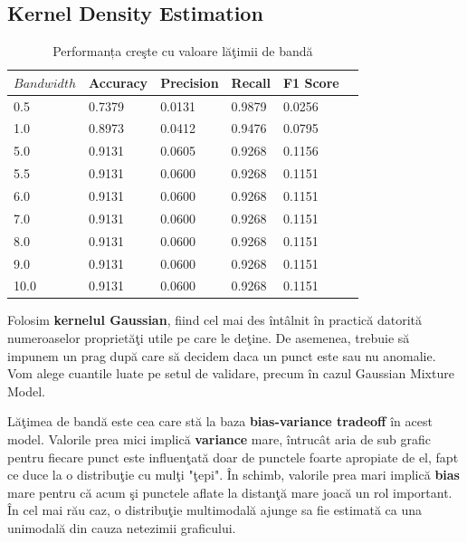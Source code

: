 \noindent
  

\subsection{Kernel Density Estimation}

\begin{table}[H]
  \centering
  \begin{tabularx}{\textwidth}{
      |X
      |X
      |X
      |X
      |X
      |X|
  }
  \hline
  $Bandwidth$ & {Accuracy} & {Precision} & {Recall} & {F1 Score} \\
  \hline
  \rowcolor{gray!20} 0.5 & 0.7379 & 0.0131 & 0.9879 & 0.0256 \\
  1.0 & 0.8973 & 0.0412 & 0.9476 & 0.0795 \\
  \rowcolor{gray!20} 5.0 & 0.9131 & 0.0605 & 0.9268 & 0.1156 \\
  5.5 & 0.9131 & 0.0600 & 0.9268 & 0.1151 \\
  \rowcolor{gray!20} 6.0 & 0.9131 & 0.0600 & 0.9268 & 0.1151 \\
  7.0 & 0.9131 & 0.0600 & 0.9268 & 0.1151 \\
  \rowcolor{gray!20} 8.0 & 0.9131 & 0.0600 & 0.9268 & 0.1151 \\
  9.0 & 0.9131 & 0.0600 & 0.9268 & 0.1151 \\
  \rowcolor{gray!20} 10.0 & 0.9131 & 0.0600 & 0.9268 & 0.1151 \\
  \hline
  \end{tabularx}
  \caption{Performanța creşte cu valoare lăţimii de bandă}
\end{table}

Folosim \textbf{kernelul Gaussian}, fiind cel mai des întâlnit în practică
datorită numeroaselor proprietăţi utile pe care le deţine. De asemenea, trebuie 
să impunem un prag după care să decidem daca un punct este sau nu anomalie. 
Vom alege cuantile luate pe setul de validare, precum în cazul 
Gaussian Mixture Model.

Lăţimea de bandă este cea care stă la baza \textbf{bias-variance tradeoff} 
în acest model.
Valorile prea mici implică \textbf{variance} mare, întrucât aria de sub grafic 
pentru fiecare punct este influenţată doar de punctele foarte apropiate de el, 
fapt ce duce la o distribuţie cu mulţi "ţepi". 
În schimb, valorile prea mari implică \textbf{bias} mare pentru că acum şi punctele 
aflate la distanţă mare joacă un rol important. În cel mai rău caz, o distribuţie 
multimodală ajunge sa fie estimată ca una unimodală din cauza netezimii graficului.

